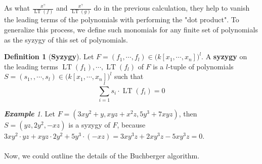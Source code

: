 \documentclass{article}
\newtheorem{lemma}[theorem]{Lemma}
\newcommand{\lt}{\ensuremath{\operatorname{LT}}}
\theoremstyle{definition}
\newtheorem{definition}{Definition}[section]
\theoremstyle{remark}
\theoremstyle{example}
\newtheorem{example}{\textbf{Example}}[section]
\begin{document}
As what $\tfrac{x^{\gamma}}{\lt(f)}$ and $\tfrac{x^{\gamma}}{\lt(g)}$ do in the previous calculation, they help to vanish the leading terms of the polynomials with performing the "dot product". To generalize this process, we define such monomials for any finite set of polynomials as the syzygy of this set of polynomials.

\begin{definition}[\textbf{Syzygy}]
    Let $F = (f_1, \cdots, f_l) \in {(k[x_1,\cdots,x_n]})^l$. A \textbf{syzygy} on the leading terms $\lt(f_1), \cdots, \lt(f_l)$ of $F$ is a $l$-tuple of polynomials $S = (s_1,,\cdots, s_l) \in {(k[x_1,\cdots,x_n]})^l$ such that
    \begin{equation}
        \sum_{i = 1}^{l} s_i \cdot \lt(f_i) = 0
    \end{equation}
\end{definition}

\begin{example}
    Let $F = (3xy^2 + y, xyz+x^2z, 5y^3+7xyz)$, then $S = (yz,2y^2,-xz)$ is a syzygy of $F$, because $3xy^2\cdot yz +xyz \cdot 2y^2 + 5y^3\cdot(-xz) = 3xy^3z + 2xy^3z - 5xy^3z = 0$.
\end{example}



\paragraph{}

Now, we could outline the details of the Buchberger algorithm.
\end{document}
